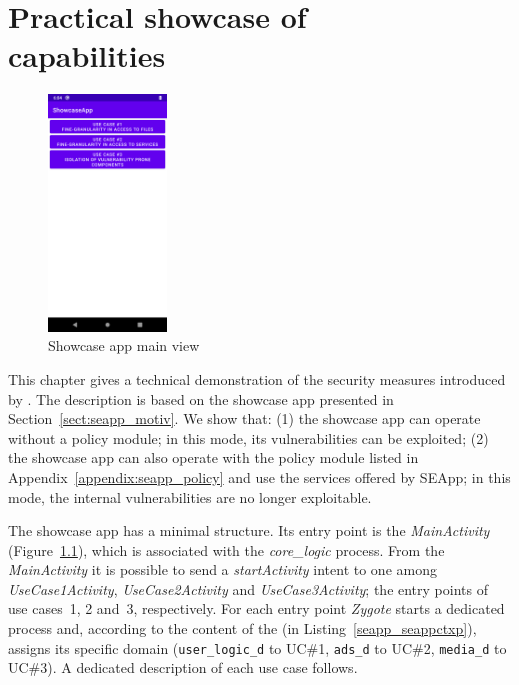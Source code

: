 \chapter[Practical showcase of \seapp capabilities]{Practical showcase of \seapp \\ capabilities}\label{appendix:seapp_analysis}

\begin{figure}
	\begin{center}
          \includegraphics[width=0.28\textwidth]{chapters/seapp/figs/ae/MainActivity.png}
        \end{center}
	\caption{Showcase app main view}
	\label{fig:seapp_mainactivity_view}
      \end{figure}
      
This chapter gives a technical demonstration of the security measures
introduced by \seapp. The description is based on the showcase app
presented in Section~\ref{sect:seapp_motiv}. We show that: (1) the
showcase app can operate without a policy module; in this mode, its
vulnerabilities can be exploited; (2) the showcase app can also
operate with the policy module listed in
Appendix~\ref{appendix:seapp_policy} and use the services offered by
SEApp; in this mode, the internal vulnerabilities are no longer
exploitable.

The showcase app has a minimal structure. Its entry point is the {\em
  MainActivity} (Figure~\ref{fig:seapp_mainactivity_view}), which is associated with the {\em core\_logic}
process. From the {\em MainActivity} it is possible to send a {\em
  startActivity} intent to one among {\em UseCase1Activity}, {\em
  UseCase2Activity} and {\em UseCase3Activity}; the entry points of
use cases~1, 2 and~3, respectively. For each entry point {\em Zygote}
starts a dedicated process and, according to the content of the
\seappcontexts (in Listing~\ref{seapp_seappctxp}), assigns its
specific domain ({\tt user\_logic\_d} to UC\#1, {\tt ads\_d} to UC\#2,
{\tt media\_d} to UC\#3).  A dedicated description of each use case
follows.

